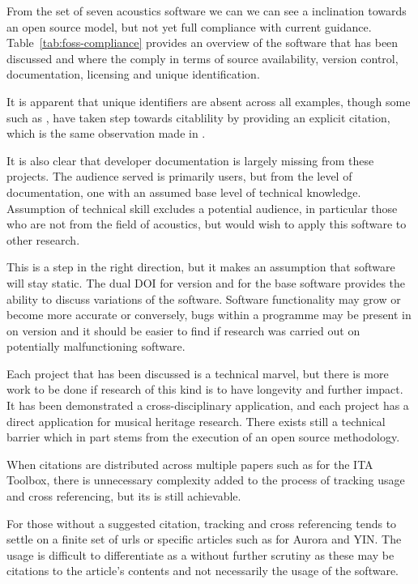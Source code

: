 From the set of seven acoustics software we can we can see a inclination towards an open source model, but not yet full compliance with current guidance. Table~\ref{tab:foss-compliance} provides an overview of the software that has been discussed and where the comply in terms of source availability, version control, documentation, licensing and unique identification.  

It is apparent that unique identifiers are absent across all examples, though some such as ,  have taken step towards citablility by providing an explicit citation, which is the same observation made in \textcite{hornikx_exploring_2024}.

It is also clear that developer documentation is largely missing from these projects. The audience served is  primarily users, but from the level of documentation, one with an assumed base level of technical knowledge. Assumption of technical skill excludes a potential audience, in particular those who are not from the field of acoustics, but would wish to apply this software to other research.

This is a step in the right direction, but it makes an assumption that software will stay static. The dual DOI for version and for the base software provides the ability to discuss variations of the software. Software functionality may grow or become more accurate or conversely, bugs within a programme may be present in on version and it should be easier to find if research was carried out on potentially malfunctioning software.

Each project that has been discussed is a technical marvel, but there is more work to be done if research of this kind is to have longevity and further impact.
It has been demonstrated a cross-disciplinary application, and each project has a direct application for musical heritage research. There exists still a technical barrier which in part stems from the execution of an open source methodology.

When citations are distributed across multiple papers such as for the ITA Toolbox, there is unnecessary complexity added to the process of tracking usage and cross referencing, but its is still achievable.

For those without a suggested citation, tracking and cross referencing tends to settle on a finite set of urls or specific articles such as for Aurora and YIN. The usage is difficult to differentiate as a without further scrutiny as these may be citations to the article's contents and not necessarily the usage of the software.

